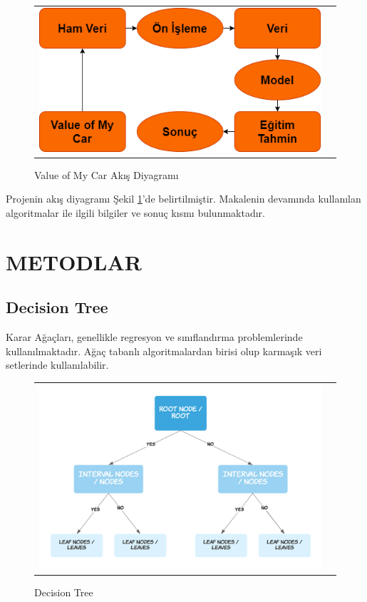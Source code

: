 \documentclass[conference]{IEEEtran}
\begin{document}
\begin{figure}[!h]
	\centering
	\begin{center}
		\begin{tabular}{cc}
			\includegraphics[scale=0.5]{pictures/pic_01.png}&
		\end{tabular}
	\end{center}
	\caption{Value of My Car Akış Diyagramı}
	\label{fig:01}
\end{figure}

Projenin akış diyagramı Şekil \ref{fig:01}'de belirtilmiştir. Makalenin devamında kullanılan algoritmalar ile ilgili bilgiler ve sonuç kısmı bulunmaktadır.

\pagebreak
\section{\textbf{METODLAR}}
\subsection{\textbf{Decision Tree}}

\quad Karar Ağaçları, genellikle regresyon ve sınıflandırma problemlerinde kullanılmaktadır. Ağaç tabanlı algoritmalardan birisi olup karmaşık veri setlerinde kullanılabilir\cite{4}.

\begin{figure}[!h]
	\centering
	\begin{center}
		\begin{tabular}{cc}
			\includegraphics[scale=0.225]{pictures/pic_02.png}&
		\end{tabular}
	\end{center}
	\caption{Decision Tree}
	\label{fig:02}
\end{figure}
\end{document}
